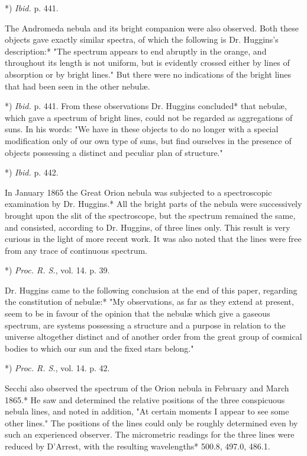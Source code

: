 \documentclass[a4paper, 12pt, oneside, polutonikogreek, english]{article}
\begin{document}
*) \emph{Ibid.} p. 441.

The Andromeda nebula and its bright companion were also observed. Both these objects gave exactly similar spectra, of which the following is Dr. Huggins's description:* "The spectrum appears to end abruptly in the orange, and throughout its length is not uniform, but is evidently crossed either by lines of absorption or by bright lines." But there were no indications of the bright lines that had been seen in the other nebulæ.

*) \emph{Ibid.} p. 441.
 From these observations Dr. Huggins concluded* that nebulæ, which gave a spectrum of bright lines, could not be regarded as aggregations of suns. In his words: "We have in these objects to do no longer with a special modification only of our own type of suns, but find ourselves in the presence of objects possessing a distinct and peculiar plan of structure."

*) \emph{Ibid.} p. 442.

In January 1865 the Great Orion nebula was subjected to a spectroscopic examination by Dr. Huggins.* All the bright parts of the nebula were successively brought upon the slit of the spectroscope, but the spectrum remained the same, and consisted, according to Dr. Huggins, of three lines only. This result is very curious in the light of more recent work. It was also noted that the lines were free from any trace of continuous spectrum.

*) \emph{Proc. R. S.}, vol. 14. p. 39.

Dr. Huggins came to the following conclusion at the end of this paper, regarding the constitution of nebulæ:* "My observations, as far as they extend at present, seem to be in favour of the opinion that the nebulæ which give a gaseous spectrum, are systems possessing a structure and a purpose in relation to the universe altogether distinct and of another order from the great group of cosmical bodies to which our sun and the fixed stars belong."

*) \emph{Proc. R. S.}, vol. 14. p. 42.

Secchi also observed the spectrum of the Orion nebula in February and March 1865.* He saw and determined the relative positions of the three conspicuous nebula lines, and noted in addition, "At certain moments I appear to see some other lines." The positions of the lines could only be roughly determined even by such an experienced observer. The micrometric readings for the three lines were reduced by D'Arrest, with the resulting wavelengths* 500.8, 497.0, 486.1.
\end{document}

